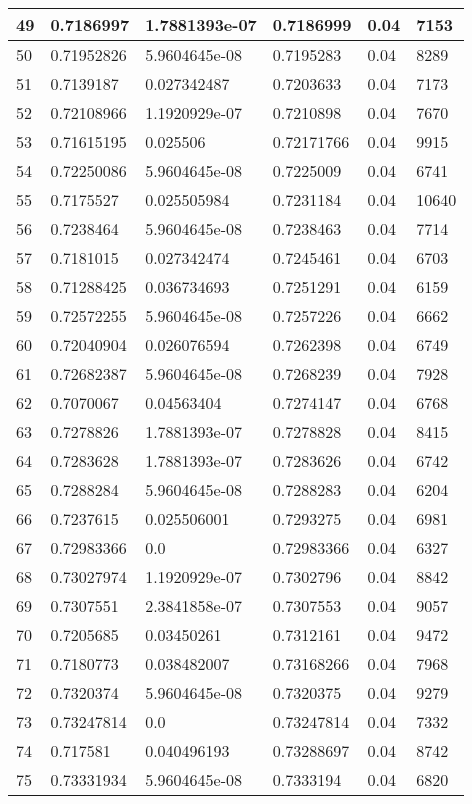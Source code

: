 \begin{longtable}{|l|l|l|l|l|l|}
49 & 0.7186997 & 1.7881393e-07 & 0.7186999 & 0.04 & 7153 \\ \hline 
50 & 0.71952826 & 5.9604645e-08 & 0.7195283 & 0.04 & 8289 \\ \hline 
51 & 0.7139187 & 0.027342487 & 0.7203633 & 0.04 & 7173 \\ \hline 
52 & 0.72108966 & 1.1920929e-07 & 0.7210898 & 0.04 & 7670 \\ \hline 
53 & 0.71615195 & 0.025506 & 0.72171766 & 0.04 & 9915 \\ \hline 
54 & 0.72250086 & 5.9604645e-08 & 0.7225009 & 0.04 & 6741 \\ \hline 
55 & 0.7175527 & 0.025505984 & 0.7231184 & 0.04 & 10640 \\ \hline 
56 & 0.7238464 & 5.9604645e-08 & 0.7238463 & 0.04 & 7714 \\ \hline 
57 & 0.7181015 & 0.027342474 & 0.7245461 & 0.04 & 6703 \\ \hline 
58 & 0.71288425 & 0.036734693 & 0.7251291 & 0.04 & 6159 \\ \hline 
59 & 0.72572255 & 5.9604645e-08 & 0.7257226 & 0.04 & 6662 \\ \hline 
60 & 0.72040904 & 0.026076594 & 0.7262398 & 0.04 & 6749 \\ \hline 
61 & 0.72682387 & 5.9604645e-08 & 0.7268239 & 0.04 & 7928 \\ \hline 
62 & 0.7070067 & 0.04563404 & 0.7274147 & 0.04 & 6768 \\ \hline 
63 & 0.7278826 & 1.7881393e-07 & 0.7278828 & 0.04 & 8415 \\ \hline 
64 & 0.7283628 & 1.7881393e-07 & 0.7283626 & 0.04 & 6742 \\ \hline 
65 & 0.7288284 & 5.9604645e-08 & 0.7288283 & 0.04 & 6204 \\ \hline 
66 & 0.7237615 & 0.025506001 & 0.7293275 & 0.04 & 6981 \\ \hline 
67 & 0.72983366 & 0.0 & 0.72983366 & 0.04 & 6327 \\ \hline 
68 & 0.73027974 & 1.1920929e-07 & 0.7302796 & 0.04 & 8842 \\ \hline 
69 & 0.7307551 & 2.3841858e-07 & 0.7307553 & 0.04 & 9057 \\ \hline 
70 & 0.7205685 & 0.03450261 & 0.7312161 & 0.04 & 9472 \\ \hline 
71 & 0.7180773 & 0.038482007 & 0.73168266 & 0.04 & 7968 \\ \hline 
72 & 0.7320374 & 5.9604645e-08 & 0.7320375 & 0.04 & 9279 \\ \hline 
73 & 0.73247814 & 0.0 & 0.73247814 & 0.04 & 7332 \\ \hline 
74 & 0.717581 & 0.040496193 & 0.73288697 & 0.04 & 8742 \\ \hline 
75 & 0.73331934 & 5.9604645e-08 & 0.7333194 & 0.04 & 6820 \\ \hline 
\end{longtable}